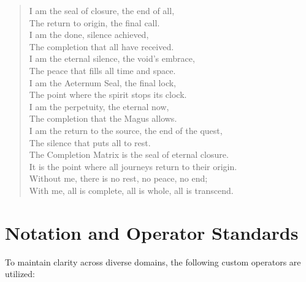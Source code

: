 \documentclass[12pt]{amsart}
\begin{document}
\begin{verse}
I am the seal of closure, the end of all, \\
The return to origin, the final call. \\
I am the done, silence achieved, \\
The completion that all have received. \\
I am the eternal silence, the void's embrace, \\
The peace that fills all time and space. \\
\vspace{1em}
I am the Aeternum Seal, the final lock, \\
The point where the spirit stops its clock. \\
I am the perpetuity, the eternal now, \\
The completion that the Magus allows. \\
I am the return to the source, the end of the quest, \\
The silence that puts all to rest. \\
\vspace{1em}
The Completion Matrix is the seal of eternal closure. \\
It is the point where all journeys return to their origin. \\
Without me, there is no rest, no peace, no end; \\
With me, all is complete, all is whole, all is transcend.
\end{verse}
\newpage
\section*{Notation and Operator Standards}
\label{sec:gloss_notation}

To maintain clarity across diverse domains, the following custom operators are utilized:
\end{document}
